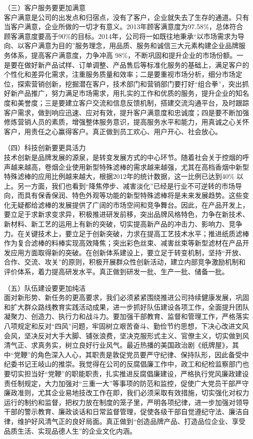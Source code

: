 （三）客户服务要更加满意\\
\indent
客户满意是公司的出发点和归宿点，没有了客户，企业就失去了生存的通道。只有当客户满意，企业所做的一切才有意义。2013年顾客满意度为97.58\%，总体符合顾客满意度要高于90\%的目标。2014年，公司将一如既往地秉承“以市场需求为导向、以客户满意为目的”服务理念，用品质、服务和诚信三大元素构建企业品牌服务体系，提高客户满意度，力争冲高 98\%，不断巩固和提升企业的市场份额。一是要在做好新产品试样、订单调整、产品售后等标准化服务的基础上，满足客户的个性化和差异化需求，注重服务质量和效率；二是要重视市场分析，细分市场定位，探索营销创新，挖掘潜在客户，技术部门和营销部门要打好“组合拳”，突出抓好新产品推广，努力满足市场需求，用扎实的工作和优质的服务，提升企业的知名度和美誉度；三是要建立客户交流和信息反馈机制，搭建交流沟通平台，及时跟踪客户需求，做到响应迅速、应对有效，提升客户满意度和忠诚度；四是要不断加强修炼营销人员的素质，增强整体服务意识，提高服务水平和能力，用真诚之心关怀客户，用责任之心赢得客户。真正做到员工欢心、用户开心、社会放心。


（四）科技创新要更具活力\\
\indent
技术创新是品牌发展的源泉，是转变发展方式的中心环节。随着社会关于控烟的呼声越来越高，卷烟企业使用新型特殊滤棒的需求越来越强，尤其在高档香烟中新型特殊滤棒的应用比例越来越大，根据2012年的统计数据，这一比例已达到40\% 以上。另一方面，我们也看到“降焦停步、减害淡化”已经是行业不可逆转的市场导向，而具有保香保润、特色外观等功能的新型特殊滤棒将是未来发展趋势。这些变化无疑都给滤棒的发展提供了广阔的市场空间和竞争舞台。因此，在产品开发上，要立足于求新求变求异，积极推进研发前移，突出品牌风格特色，力争在新技术、新材料、新工艺的运用上有新的突破，切实提高新产品的冲击力、影响力、竞争力。在关键技术上，要立足于创新突破，力求在提高工艺技术水平；推进纸质滤棒作为复合滤棒的料棒实现高效降焦；突出彩色丝束、减害丝束等新型滤材在产品开发应用方面取得新的突破。在创新体系建设上，要立足于转变机制，坚持“开放、合作、交流、攻关”的原则，积极开展群众性创新活动，建立内部竞争激励机制和评价体系，着力提高研发水平。真正做到研发一批、生产一批、储备一批。

（五）队伍建设要更加纯洁\\
\indent
面对新形势、新任务的更高要求，我们必须紧紧围绕推进公司持续健康发展，巩固和扩大群众路线教育实践活动成果，进一步抓好队伍建设各项工作，全面提升团队凝聚力、创造力、执行力和战斗力。要加强干部教育、监督和管理工作，严格落实八项规定和反对“四风”问题，牢固树立艰苦奋斗、勤俭节约思想，下决心改进文风会风，坚决反对大手大脚、铺张浪费，坚决克服形式主义、官僚主义，切实做到风清气正、求真务实，树立良好行业风气。最近热播的美国政治剧《纸牌屋》，其中“党鞭”的角色深入人心，其职责是敦促党员要严守纪律、保持队形，因此备受中纪委书记王岐山的推崇。我觉得在公司的反腐倡廉工作中，政工和纪检监察部门也要切实担当好“党鞭”的职能职责，扎实推进反腐倡廉建设，严格执行党风廉政建设责任制规定，大力加强对“三重一大”等事项的防范和监控，促使广大党员干部严守廉政准则，尤其企业易地技改工作在即，我们必须采取有效措施，切实强化对权力运行的制约和监督，把权力放在制度的笼子里，严明各项纪律，进一步加强对领导干部的警示教育、廉政谈话和日常监督管理，促使各级干部自觉遵纪守法、廉洁自律，维护好风清气正的良好局面。真正做到“创造品牌产品、打造品位企业、享受品质生活、实现品德人生”的企业文化内涵。


